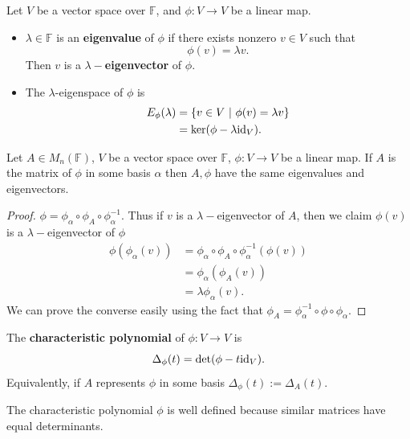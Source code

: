 \begin{definition}
    Let $V$ be a vector space over $\mathbb{F}$, and $\phi : V \rightarrow V$ be a linear map.
    \begin{itemize}
      \item $\lambda \in \mathbb{F}$ is an {\bf eigenvalue} of $\phi$ if there exists nonzero $v \in V$ such that
        \[\phi(v) = \lambda v.\]
        Then $v$ is a $\lambda-${\bf eigenvector} of $\phi$.
      \item The $\lambda$-eigenspace of $\phi$ is
        \begin{align*}
          E_\phi (\lambda) &= \{ v \in V \ | \ \phi(v) = \lambda v \} \\
                           &= \ker(\phi - \lambda \mathrm{id}_V)
        .\end{align*}

    \end{itemize}
\end{definition}

\begin{lemma}
    Let $A \in M_n(\mathbb{F})$, $V$ be a vector space over $\mathbb{F}$, $\phi : V \rightarrow V$ be a linear map. If $A$ is the matrix of $\phi$ in some basis $\alpha$ then $A,\phi$ have the same eigenvalues and eigenvectors.
\end{lemma}
\begin{proof} 
$\phi = \phi_\alpha \circ \phi_A \circ \phi_\alpha^{-1}$. Thus if $v$ is a $\lambda-$eigenvector of $A$, then we claim $\phi(v)$ is a $\lambda-$eigenvector of $\phi$
\begin{align*}
  \phi(\phi_\alpha(v)) &= \phi_\alpha \circ \phi_A \circ \phi_\alpha^{-1}(\phi(v)) \\
          &= \phi_\alpha (\phi_A(v)) \\
          &= \lambda \phi_\alpha(v)
.\end{align*}
We can prove the converse easily using the fact that $\phi_A = \phi_\alpha^{-1} \circ \phi \circ \phi_\alpha$.
\end{proof}

\begin{definition}
The {\bf characteristic polynomial} of $\phi : V \rightarrow V$ is
    \[\Delta_\phi(t) = \det(\phi - t \mathrm{id}_V).\]
    Equivalently, if $A$ represents $\phi$ in some basis $\Delta_\phi(t) := \Delta_A(t)$.
\end{definition}

\begin{remark}
    The characteristic polynomial $\phi$ is well defined because similar matrices have equal determinants.
\end{remark}

